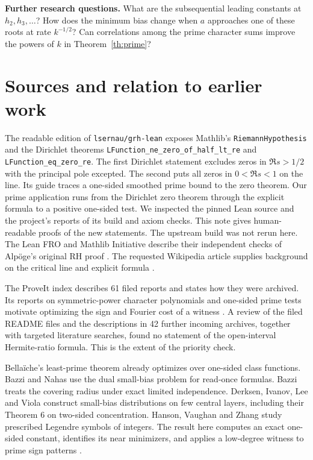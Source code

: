 \documentclass[11pt,letterpaper]{article}
\theoremstyle{research}
\newcommand{\sect}[1]{\section{\texorpdfstring{\color{ink}#1}{#1}}}
\begin{document}
\textbf{Further research questions.}
What are the subsequential leading constants at $h_2,h_3,\ldots$? How does
the minimum bias change when $a$ approaches one of these roots at rate
$k^{-1/2}$? Can correlations among the prime character sums improve the
powers of $k$ in Theorem~\ref{th:prime}?
\clearpage
\sect{Sources and relation to earlier work}
The readable edition of \texttt{lsernau/grh-lean} exposes Mathlib's
\texttt{RiemannHypothesis} and the Dirichlet theorems
\texttt{LFunction\_ne\_zero\_of\_half\_lt\_re} and
\texttt{LFunction\_eq\_zero\_re}. The first Dirichlet statement excludes
zeros in $\Re s>1/2$ with the principal pole excepted. The second puts
all zeros in $0<\Re s<1$ on the line. Its guide traces a one-sided
smoothed prime bound to the zero theorem. Our prime application runs
from the Dirichlet zero theorem through the explicit formula to a positive
one-sided test. We inspected the pinned Lean source and the project's
reports of its build and axiom checks. This note gives human-readable
proofs of the new statements. The upstream build was not rerun here.
The Lean FRO and Mathlib Initiative describe their independent checks
of Alpöge's original RH proof \cite{lean,fro}. The requested Wikipedia
article supplies background on the critical line and explicit formula
\cite{wiki}.

The ProveIt index describes 61 filed reports and states how they were
archived. Its reports on symmetric-power character polynomials and
one-sided prime tests motivate optimizing the sign and Fourier cost of
a witness \cite{proveit}. A review of the filed README files and the
descriptions in 42 further incoming archives, together with targeted
literature searches, found no statement of the open-interval Hermite-ratio
formula. This is the extent of the priority check.

Bellaïche's least-prime theorem already optimizes over one-sided
class functions. Bazzi and Nahas use the dual small-bias problem for
read-once formulas. Bazzi treats the covering radius under exact limited
independence. Derksen, Ivanov, Lee and Viola construct small-bias
distributions on few central layers, including their Theorem 6 on
two-sided concentration. Hanson, Vaughan and Zhang study prescribed
Legendre symbols of integers. The result here computes an exact
one-sided constant, identifies its near minimizers, and applies a
low-degree witness to prime sign patterns \cite{bellaiche,cnf,bazzi,dilv,hvz}.
\end{document}
